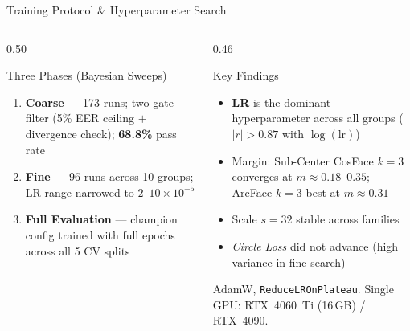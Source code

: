 \documentclass[aspectratio=169,10pt]{beamer}
\begin{document}
\begin{frame}{Training Protocol \& Hyperparameter Search}

  \begin{columns}[T]
    \begin{column}{0.50\linewidth}
      \begin{block}{Three Phases (Bayesian Sweeps)}
        \footnotesize
        \begin{enumerate}\setlength\itemsep{5pt}
          \item \textbf{Coarse} --- 173 runs; two-gate filter
                (5\% EER ceiling $+$ divergence check); \textbf{68.8\%} pass rate
          \item \textbf{Fine} --- 96 runs across 10 groups; LR range
                narrowed to $2$--$10\times10^{-5}$
          \item \textbf{Full Evaluation} --- champion config trained with
                full epochs across all 5 CV splits
        \end{enumerate}
      \end{block}
    \end{column}

    \begin{column}{0.46\linewidth}
      \begin{alertblock}{Key Findings}
        \footnotesize
        \begin{itemize}\setlength\itemsep{4pt}
          \item \textbf{LR} is the dominant hyperparameter across all groups
                ($|r| > 0.87$ with $\log(\text{lr})$)
          \item Margin: Sub-Center CosFace $k{=}3$ converges at $m\approx0.18$--$0.35$;
                ArcFace $k{=}3$ best at $m\approx0.31$
          \item Scale $s = 32$ stable across families
          \item \textit{Circle Loss} did not advance (high variance in fine search)
        \end{itemize}
      \end{alertblock}
      \vspace{4pt}
      {\footnotesize AdamW, \texttt{ReduceLROnPlateau}. Single GPU:
      RTX~4060~Ti (16\,GB) / RTX~4090.}
    \end{column}
  \end{columns}
\end{frame}
\end{document}
